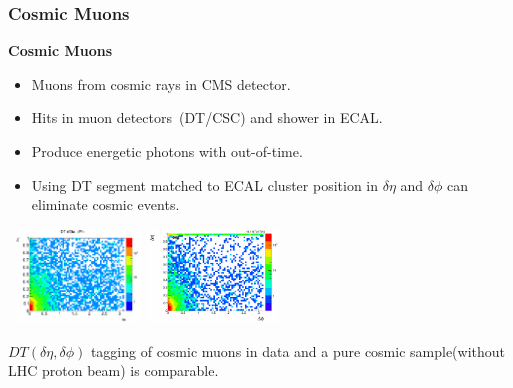 \documentclass{beamer}
\begin{document}
\begin{frame}
\frametitle{Cosmic Muons}
\small{
 \begin{varblock}[7cm]{\textbf{Cosmic Muons}}
 \begin{itemize}
  \item Muons from cosmic rays in CMS detector.
  \item Hits in muon detectors~(DT/CSC) and shower in ECAL.
  \item Produce energetic photons with out-of-time.
  \item Using DT segment matched to ECAL cluster position in $\delta \eta$ and $\delta \phi$ can eliminate cosmic events.
 \end{itemize}
 \end{varblock}
 }
 \vspace{-0.2cm}
 \begin{tcolorbox}[colback=UNL@Cream!5,colframe=UMN@Maroon!40,title=\textcolor{black}{$DT(\delta \eta, \delta \phi)$\textbf{Cosmic Muon dataset(left) and Data(Right)}}]
 \mbox{ 
 \includegraphics[height=2.50cm,width=0.3\paperwidth]{THESISPLOTS/Cosmic_Ray_Photons_Cosmic_dataset.png} \quad \quad
 \includegraphics[height=2.50cm,width=0.3\paperwidth]{THESISPLOTS/cosmics_dPhidEta.png}
 } 
 \end{tcolorbox}
 \vspace{-0.2cm}
 $DT(\delta \eta, \delta \phi)$ tagging of cosmic muons in data and a pure cosmic sample(without LHC proton beam) is comparable.
 
 
\end{frame}
\end{document}
